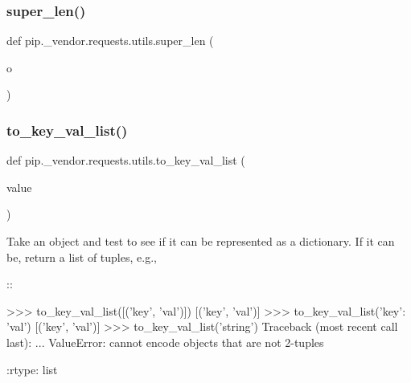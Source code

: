 \subsubsection{\texorpdfstring{super\+\_\+len()}{super\_len()}}
{\footnotesize\ttfamily def pip.\+\_\+vendor.\+requests.\+utils.\+super\+\_\+len (\begin{DoxyParamCaption}\item[{}]{o }\end{DoxyParamCaption})}

\mbox{\label{namespacepip_1_1__vendor_1_1requests_1_1utils_a387fb02387fa79d4087ff5396ee653cb}} 
\subsubsection{\texorpdfstring{to\+\_\+key\+\_\+val\+\_\+list()}{to\_key\_val\_list()}}
{\footnotesize\ttfamily def pip.\+\_\+vendor.\+requests.\+utils.\+to\+\_\+key\+\_\+val\+\_\+list (\begin{DoxyParamCaption}\item[{}]{value }\end{DoxyParamCaption})}

\begin{DoxyVerb}Take an object and test to see if it can be represented as a
dictionary. If it can be, return a list of tuples, e.g.,

::

    >>> to_key_val_list([('key', 'val')])
    [('key', 'val')]
    >>> to_key_val_list({'key': 'val'})
    [('key', 'val')]
    >>> to_key_val_list('string')
    Traceback (most recent call last):
    ...
    ValueError: cannot encode objects that are not 2-tuples

:rtype: list
\end{DoxyVerb}
 \mbox{\label{namespacepip_1_1__vendor_1_1requests_1_1utils_ad066c2e49fc6bb25482c1a6ae0ef2f46}} 
